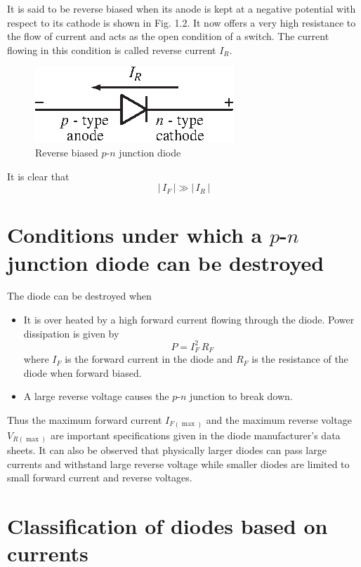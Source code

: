 It is said to be reverse biased when its anode is kept at a negative
potential with respect to its cathode is shown in Fig. 1.2. It now
offers a very high resistance to the flow of current and acts as the
open condition of a switch. The current flowing in this condition is
called reverse current $I_R$.
\begin{figure}[H]
\centering
\includegraphics[scale=1.25]{chap1/S3-EE-01-002.eps}
\caption{Reverse biased $p$-$n$ junction diode}\label{fig1.2}
\end{figure}

It is clear that 
\begin{equation}
|\,I_F\,| \gg |\,I_R\,| \label{eq1.1}
\end{equation}


\section{Conditions under which a {\boldmath$p$-$n$} junction diode
  can be destroyed}\label{sec1.2}
The diode can be destroyed when 
\begin{itemize}
\item It is over heated by a high forward current flowing
  through the diode. Power dissipation is given by
\begin{equation}
P = I^2_F\, R_F \label{eq1.2}
\end{equation}
where $I_F$ is the forward current in the diode and $R_F$ is the
resistance of the diode when forward biased.

\item A large reverse voltage causes the $p$-$n$ junction to
  break down.
\end{itemize}

Thus the maximum forward current $I_{F(\max)}$ and the maximum reverse
voltage $V_{R(\max)}$ are important specifications given in the
diode manufacturer's data sheets. It can also be observed that
physically larger diodes can pass large currents and withstand large
reverse voltage while smaller diodes are limited to small forward
current and reverse voltages.

\section{Classification of diodes based on currents}\label{sec1.3}

